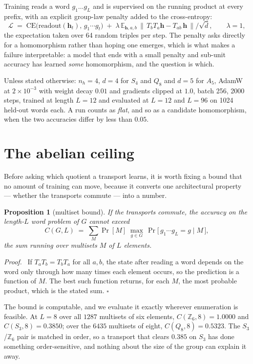 \documentclass[10pt]{article}
\newtheorem{proposition}{Proposition}
\newenvironment{proof}{\par\noindent\textit{Proof.}\ }{\hfill$\square$\par\medskip}
\newcommand{\bh}{\mathbf{h}}
\begin{document}
Training reads a word $g_1\dots g_L$ and is supervised on the running product at every prefix, with
an explicit group-law penalty added to the cross-entropy:
\[
  \mathcal{L} \;=\; \mathrm{CE}\bigl(\text{readout}(\bh_t),\, g_1\cdots g_t\bigr)
  \;+\; \lambda\,\mathbb{E}_{\bh,a,b}\,\bigl\|\,T_b T_a \bh - T_{ab}\,\bh\,\bigr\| / \sqrt{d},
  \qquad \lambda = 1 ,
\]
the expectation taken over 64 random triples per step. The penalty asks directly for a homomorphism
rather than hoping one emerges, which is what makes a failure interpretable: a model that ends with a
small penalty and sub-unit accuracy has learned \emph{some} homomorphism, and the question is which.

Unless stated otherwise: $n_h=4$, $d=4$ for $S_4$ and $Q_8$ and $d=5$ for $A_5$, AdamW at
$2\times10^{-3}$ with weight decay $0.01$ and gradients clipped at $1.0$, batch 256, 2000 steps,
trained at length $L=12$ and evaluated at $L=12$ and $L=96$ on 1024 held-out words each. A run counts
as \emph{flat}, and so as a candidate homomorphism, when the two accuracies differ by less than
$0.05$.

\section{The abelian ceiling}
\label{sec:ceiling}

Before asking which quotient a transport learns, it is worth fixing a bound that no amount of
training can move, because it converts one architectural property --- whether the transports commute
--- into a number.

\begin{proposition}[multiset bound]
If the transports commute, the accuracy on the length-$L$ word problem of $G$ cannot exceed
\[
  C(G,L) \;=\; \sum_{M} \Pr[M]\;\max_{g\in G}\,\Pr\bigl[\,g_1\cdots g_L = g \mid M\,\bigr],
\]
the sum running over multisets $M$ of $L$ elements.
\end{proposition}
\begin{proof}
If $T_aT_b=T_bT_a$ for all $a,b$, the state after reading a word depends on the word only through how
many times each element occurs, so the prediction is a function of $M$. The best such function
returns, for each $M$, the most probable product, which is the stated sum.
\end{proof}

The bound is computable, and we evaluate it exactly wherever enumeration is feasible. At $L=8$ over
all $1287$ multisets of six elements, $C(\mathbb{Z}_6,8)=1.0000$ and $C(S_3,8)=0.3850$; over the
$6435$ multisets of eight, $C(Q_8,8)=0.5323$. The $S_3$/$\mathbb{Z}_6$ pair is matched in order, so a
transport that clears $0.385$ on $S_3$ has done something order-sensitive, and nothing about the size
of the group can explain it away.
\end{document}
